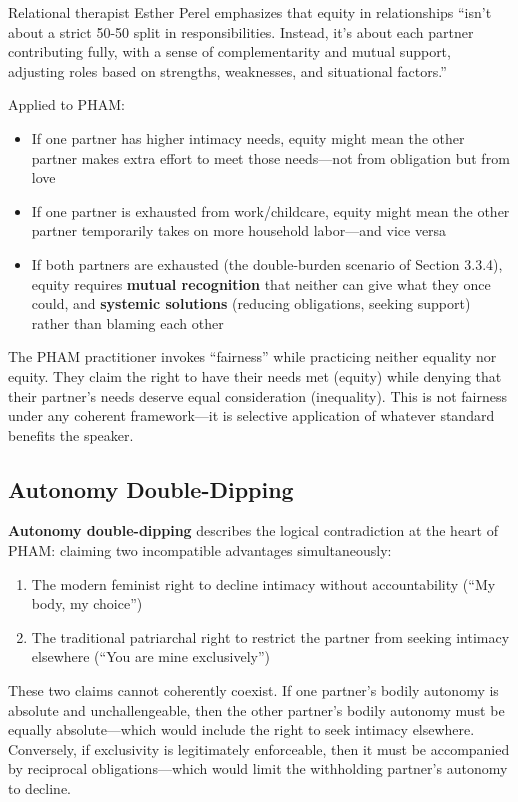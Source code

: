 \documentclass[12pt, letterpaper]{article}
\begin{document}
Relational therapist Esther Perel emphasizes that equity in relationships ``isn't about a strict 50-50 split in responsibilities. Instead, it's about each partner contributing fully, with a sense of complementarity and mutual support, adjusting roles based on strengths, weaknesses, and situational factors.''

Applied to PHAM:
\begin{itemize}
    \item If one partner has higher intimacy needs, equity might mean the other partner makes extra effort to meet those needs---not from obligation but from love
    \item If one partner is exhausted from work/childcare, equity might mean the other partner temporarily takes on more household labor---and vice versa
    \item If both partners are exhausted (the double-burden scenario of Section 3.3.4), equity requires \textbf{mutual recognition} that neither can give what they once could, and \textbf{systemic solutions} (reducing obligations, seeking support) rather than blaming each other
\end{itemize}

The PHAM practitioner invokes ``fairness'' while practicing neither equality nor equity. They claim the right to have their needs met (equity) while denying that their partner's needs deserve equal consideration (inequality). This is not fairness under any coherent framework---it is selective application of whatever standard benefits the speaker.

\subsection{Autonomy Double-Dipping}

\textbf{Autonomy double-dipping} describes the logical contradiction at the heart of PHAM: claiming two incompatible advantages simultaneously:

\begin{enumerate}
    \item The modern feminist right to decline intimacy without accountability (``My body, my choice'')
    \item The traditional patriarchal right to restrict the partner from seeking intimacy elsewhere (``You are mine exclusively'')
\end{enumerate}

These two claims cannot coherently coexist. If one partner's bodily autonomy is absolute and unchallengeable, then the other partner's bodily autonomy must be equally absolute---which would include the right to seek intimacy elsewhere. Conversely, if exclusivity is legitimately enforceable, then it must be accompanied by reciprocal obligations---which would limit the withholding partner's autonomy to decline.
\end{document}

